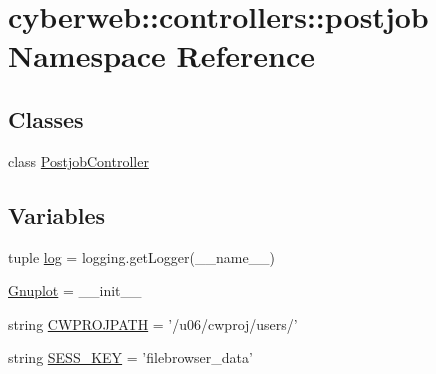 \hypertarget{namespacecyberweb_1_1controllers_1_1postjob}{\section{cyberweb\-:\-:controllers\-:\-:postjob \-Namespace \-Reference}
\label{namespacecyberweb_1_1controllers_1_1postjob}
}
\subsection*{\-Classes}
\begin{DoxyCompactItemize}
\item 
class \hyperlink{classcyberweb_1_1controllers_1_1postjob_1_1_postjob_controller}{\-Postjob\-Controller}
\end{DoxyCompactItemize}
\subsection*{\-Variables}
\begin{DoxyCompactItemize}
\item 
tuple \hyperlink{namespacecyberweb_1_1controllers_1_1postjob_a55a4037458c229aed4f7760fbbd863c4}{log} = logging.\-get\-Logger(\-\_\-\-\_\-name\-\_\-\-\_\-)
\item 
\hyperlink{namespacecyberweb_1_1controllers_1_1postjob_a38c4eb21829d1c14ab95ed4bbd39afd3}{\-Gnuplot} = \-\_\-\-\_\-init\-\_\-\-\_\-
\item 
string \hyperlink{namespacecyberweb_1_1controllers_1_1postjob_a1ec6befe6b35c4526dce073d7c1d3657}{\-C\-W\-P\-R\-O\-J\-P\-A\-T\-H} = '/u06/cwproj/users/'
\item 
string \hyperlink{namespacecyberweb_1_1controllers_1_1postjob_a8469d799a7937a01481f21c451829f8d}{\-S\-E\-S\-S\-\_\-\-K\-E\-Y} = 'filebrowser\-\_\-data'
\end{DoxyCompactItemize}


